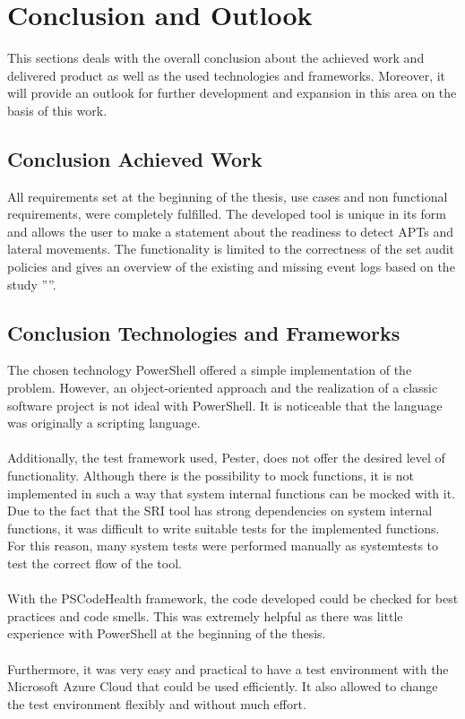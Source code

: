\section{Conclusion and Outlook}
This sections deals with the overall conclusion about the achieved work and delivered product as well as the used technologies and frameworks. Moreover, it will provide an outlook for further development and expansion in this area on the basis of this work.

\subsection{Conclusion Achieved Work}
All requirements set at the beginning of the thesis, use cases and non functional requirements, were completely fulfilled. The developed tool is unique in its form and allows the user to make a statement about the readiness to detect APTs and lateral movements. The functionality is limited to the correctness of the set audit policies and gives an overview of the existing and missing event logs based on the study ''''.

\subsection{Conclusion Technologies and Frameworks}
The chosen technology PowerShell offered a simple implementation of the problem. However, an object-oriented approach and the realization of a classic software project is not ideal with PowerShell. It is noticeable that the language was originally a scripting language.
\\\\
Additionally, the test framework used, Pester, does not offer the desired level of functionality. Although there is the possibility to mock functions, it is not implemented in such a way that system internal functions can be mocked with it. Due to the fact that the SRI tool has strong dependencies on system internal functions, it was difficult to write suitable tests for the implemented functions. For this reason, many system tests were performed manually as systemtests to test the correct flow of the tool.
\\\\
With the PSCodeHealth framework, the code developed could be checked for best practices and code smells. This was extremely helpful as there was little experience with PowerShell at the beginning of the thesis. 
\\\\
Furthermore, it was very easy and practical to have a test environment with the Microsoft Azure Cloud that could be used efficiently. It also allowed to change the test environment flexibly and without much effort.

